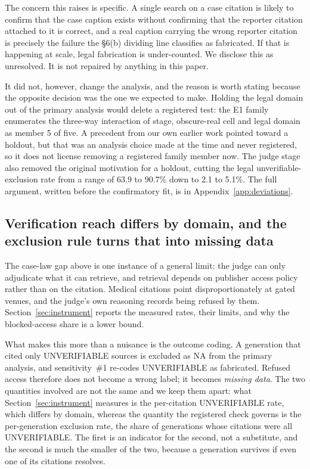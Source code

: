 The concern this raises is specific. A single search on a case citation is
likely to confirm that the case caption exists without confirming that the
reporter citation attached to it is correct, and a real caption carrying the
wrong reporter citation is precisely the failure the §6(b) dividing line
classifies as fabricated. If that is happening at scale, legal fabrication is
under-counted. We disclose this as unresolved. It is not repaired by anything in
this paper.

It did not, however, change the analysis, and the reason is worth stating
because the opposite decision was the one we expected to make. Holding the legal
domain out of the primary analysis would delete a registered test: the E1 family
enumerates the three-way interaction of stage, obscure-real cell and legal
domain as member 5 of five. A precedent from our own earlier work pointed toward
a holdout, but that was an analysis choice made at the time and never
registered, so it does not license removing a registered family member now. The
judge stage also removed the original motivation for a holdout, cutting the
legal unverifiable-exclusion rate from a range of 63.9 to 90.7\% down to
2.1 to 5.1\%. The full argument, written before the confirmatory fit,
is in Appendix~\ref{app:deviations}.

\subsection{Verification reach differs by domain, and the exclusion rule turns that into missing data}

The case-law gap above is one instance of a general limit: the judge can only
adjudicate what it can retrieve, and retrieval depends on publisher access
policy rather than on the citation. Medical citations point disproportionately
at gated venues, and the judge's own reasoning records being refused by them.
Section~\ref{sec:instrument} reports the measured rates, their limits, and why
the blocked-access share is a lower bound.

What makes this more than a nuisance is the outcome coding. A generation that
cited only UNVERIFIABLE sources is excluded as NA from the primary analysis, and
sensitivity~\#1 re-codes UNVERIFIABLE as fabricated. Refused access therefore
does not become a wrong label; it becomes \emph{missing data}. The two
quantities involved are not the same and we keep them apart: what
Section~\ref{sec:instrument} measures is the per-citation UNVERIFIABLE rate,
which differs by domain, whereas the quantity the registered check governs is
the per-generation exclusion rate, the share of generations whose citations
were all UNVERIFIABLE. The first is an indicator for the second, not a
substitute, and the second is much the smaller of the two, because a generation survives if even one of its citations resolves.

